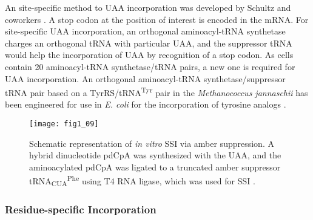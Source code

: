 \begin{refsection}
An  site-specific method to UAA incorporation was developed by
Schultz and coworkers \cite{Wang2001,Wang2002}. A stop codon at the position of
interest is encoded in the mRNA. For  site-specific UAA
incorporation, an orthogonal aminoacyl-tRNA synthetase charges an orthogonal
tRNA with particular UAA, and the suppressor tRNA would help the incorporation
of UAA by recognition of a stop codon. As cells contain 20 aminoacyl-tRNA
synthetase/tRNA pairs, a new one is required for UAA incorporation. An
orthogonal aminoacyl-tRNA synthetase/suppressor tRNA pair based on a
TyrRS/tRNA\textsuperscript{Tyr} pair in the \emph{Methanococcus jannaschii} has
been engineered for use in \emph{E.  coli} for the incorporation of tyrosine
analogs \cite{Wang2001}.
\begin{figure}[h!] \centering \texttt{[image: fig1\_09]}
    \caption[Schematic representation of \emph{in vitro} SSI via amber
        suppression. A hybrid dinucleotide pdCpA was synthesized with the UAA,
        and the aminoacylated pdCpA was ligated to a truncated amber suppressor
        tRNA\textsubscript{CUA}\textsuperscript{Phe} using T4 RNA ligase, which
        was used for SSI.]{Schematic representation of \emph{in vitro} SSI via
        amber suppression. A hybrid dinucleotide pdCpA was synthesized with the
        UAA, and the aminoacylated pdCpA was ligated to a truncated amber
        suppressor tRNA\textsubscript{CUA}\textsuperscript{Phe} using T4 RNA
        ligase, which was used for SSI \cite{Theato2013,Wang2001}.} 
    \label{fig:ssi-intro} 
\end{figure}

\subsubsection{ Residue-specific Incorporation}


\end{refsection}
